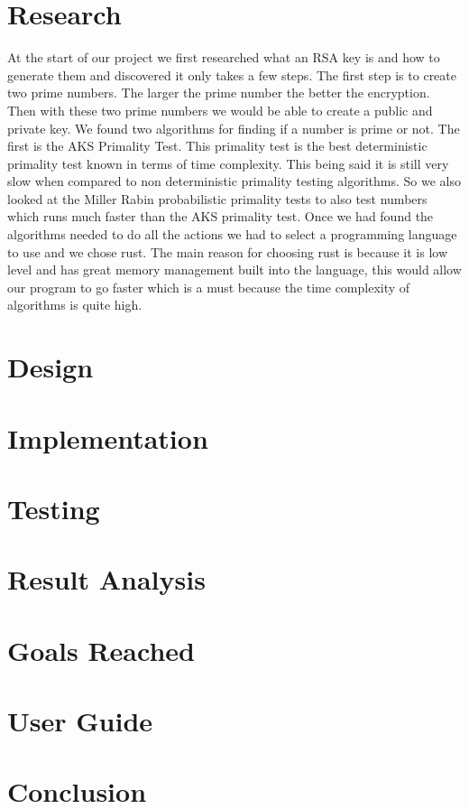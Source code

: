 \documentclass[12pt,journal,compsoc]{IEEEtran}
\begin{document}
\section{Research}
At the start of our project we first researched what an RSA key is and how to generate them and discovered it only takes a few steps. The first step is to create two prime numbers. The larger the prime number the better the encryption. Then with these two prime numbers we would be able to create a public and private key. 
\newline \indent We found two algorithms for finding if a number is prime or not. The first is the AKS Primality Test. This primality test is the best deterministic primality test known in terms of time complexity. This being said it is still very slow when compared to non deterministic primality testing algorithms. So we also looked at the Miller Rabin probabilistic primality tests to also test numbers which runs much faster than the AKS primality test.
\newline \indent Once we had found the algorithms needed to do all the actions we had to select a programming language to use and we chose rust. The main reason for choosing rust is because it is low level and has great memory management built into the language, this would allow our program to go faster which is a must because the time complexity of algorithms is quite high.

\section{Design}


\section{Implementation}

\section{Testing}

\section{Result Analysis}

\section{Goals Reached}

\section{User Guide}

\section{Conclusion}


\appendices

\end{document}
